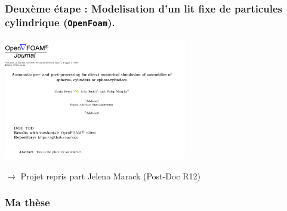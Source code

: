 \documentclass{sintefbeamer}
\begin{document}
\begin{frame}
  \frametitle{Deux\`eme \'etape : Modelisation d'un lit fixe de particules cylindrique (\texttt{OpenFoam}).}

  \centering
\includegraphics[width=0.6\textwidth]{image/OpenfoamJ.png}

$\to$ Projet repris part Jelena Marack (Post-Doc R12) 
\end{frame}


\begin{frame}
  \frametitle{Ma th\`ese}

  

\end{frame}
\end{document}
